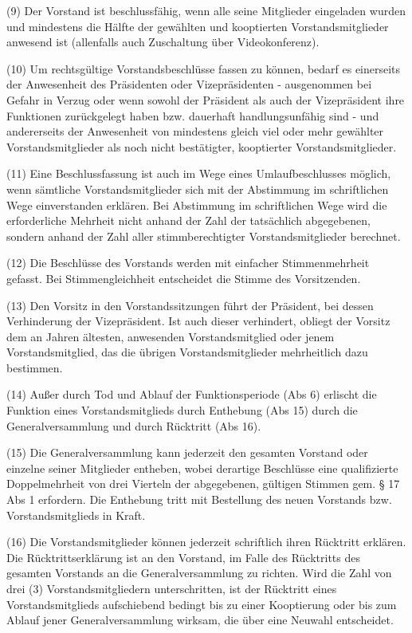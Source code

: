 \documentclass[11pt,a4paper]{article}
\begin{document}
(9)
Der Vorstand ist beschlussfähig, wenn alle seine Mitglieder eingeladen wurden und mindestens die Hälfte der gewählten und kooptierten Vorstandsmitglieder anwesend ist (allenfalls auch Zuschaltung über Videokonferenz).

(10)
Um rechtsgültige Vorstandsbeschlüsse fassen zu können, bedarf es einerseits der Anwesenheit des Präsidenten oder Vizepräsidenten - ausgenommen bei Gefahr in Verzug oder wenn sowohl der Präsident als auch der Vizepräsident ihre Funktionen zurückgelegt haben bzw. dauerhaft handlungsunfähig sind - und andererseits der Anwesenheit von mindestens gleich viel oder mehr gewählter Vorstandsmitglieder als noch nicht bestätigter, kooptierter Vorstandsmitglieder.

(11)
Eine Beschlussfassung ist auch im Wege eines Umlaufbeschlusses möglich, wenn sämtliche Vorstandsmitglieder sich mit der Abstimmung im schriftlichen Wege einverstanden erklären.
Bei Abstimmung im schriftlichen Wege wird die erforderliche Mehrheit nicht anhand der Zahl der tatsächlich abgegebenen, sondern anhand der Zahl aller stimmberechtigter Vorstandsmitglieder berechnet.

(12)
Die Beschlüsse des Vorstands werden mit einfacher Stimmenmehrheit gefasst.
Bei Stimmengleichheit entscheidet die Stimme des Vorsitzenden.

(13)
Den Vorsitz in den Vorstandssitzungen führt der Präsident, bei dessen Verhinderung der Vizepräsident.
Ist auch dieser verhindert, obliegt der Vorsitz dem an Jahren ältesten, anwesenden Vorstandsmitglied oder jenem Vorstandsmitglied, das die übrigen Vorstandsmitglieder mehrheitlich dazu bestimmen.

(14)
Außer durch Tod und Ablauf der Funktionsperiode (Abs 6) erlischt die Funktion eines Vorstandsmitglieds durch Enthebung (Abs 15) durch die Generalversammlung und durch Rücktritt (Abs 16).

(15)
Die Generalversammlung kann jederzeit den gesamten Vorstand oder einzelne seiner Mitglieder entheben, wobei derartige Beschlüsse eine qualifizierte Doppelmehrheit von drei Vierteln der abgegebenen, gültigen Stimmen gem. § 17 Abs 1 erfordern.
Die Enthebung tritt mit Bestellung des neuen Vorstands bzw. Vorstandsmitglieds in Kraft.

(16)
Die Vorstandsmitglieder können jederzeit schriftlich ihren Rücktritt erklären.
Die Rücktrittserklärung ist an den Vorstand, im Falle des Rücktritts des gesamten Vorstands an die Generalversammlung zu richten.
Wird die Zahl von drei (3) Vorstandsmitgliedern unterschritten, ist der Rücktritt eines Vorstandsmitglieds aufschiebend bedingt bis zu einer Kooptierung oder bis zum Ablauf jener Generalversammlung wirksam, die über eine Neuwahl entscheidet.
\end{document}
